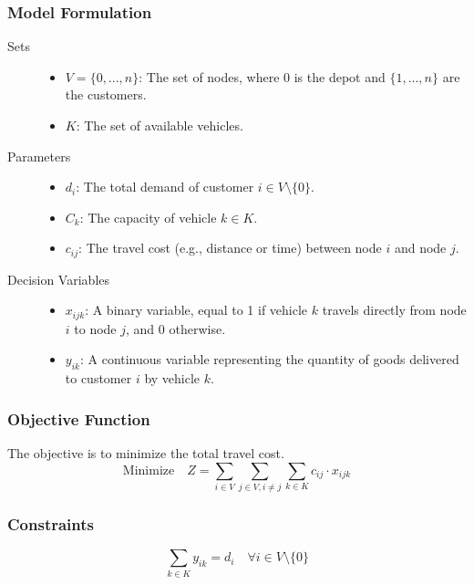 \documentclass{article}
\begin{document}
\subsubsection{Model Formulation}
\begin{description}
    \item[Sets]
    \begin{itemize}
        \item $V = \{0, ..., n\}$: The set of nodes, where 0 is the depot and $\{1, ..., n\}$ are the customers.
        \item $K$: The set of available vehicles.
    \end{itemize}

    \item[Parameters]
    \begin{itemize}
        \item $d_i$: The total demand of customer $i \in V \setminus \{0\}$.
        \item $C_k$: The capacity of vehicle $k \in K$.
        \item $c_{ij}$: The travel cost (e.g., distance or time) between node $i$ and node $j$.
    \end{itemize}

    \item[Decision Variables]
    \begin{itemize}
        \item $x_{ijk}$: A binary variable, equal to 1 if vehicle $k$ travels directly from node $i$ to node $j$, and 0 otherwise.
        \item $y_{ik}$: A continuous variable representing the quantity of goods delivered to customer $i$ by vehicle $k$.
    \end{itemize}
\end{description}

\subsubsection{Objective Function}
The objective is to minimize the total travel cost.
\begin{equation}
\text{Minimize} \quad Z = \sum_{i \in V} \sum_{j \in V, i \neq j} \sum_{k \in K} c_{ij} \cdot x_{ijk}
\end{equation}

\subsubsection{Constraints}
\begin{equation}
\sum_{k \in K} y_{ik} = d_i \quad \forall i \in V \setminus \{0\} \label{eq:demand_satisfaction}
\end{equation}
\end{document}
